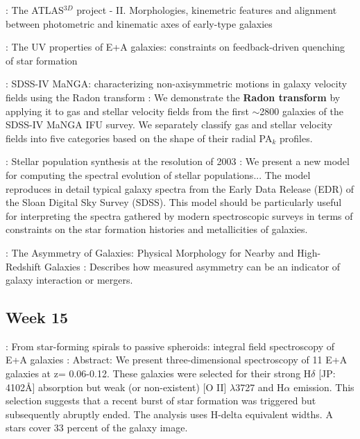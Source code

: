 \documentclass[ceqn,usenatbib,onecolumn]{mnras}
\begin{document}
\par \citet{2011MNRAS.414.2923K} : {The ATLAS$^{3D}$ project - II. Morphologies, kinemetric features and alignment between photometric and kinematic axes of early-type galaxies}
\par \citet{2007MNRAS.382..960K} : {The UV properties of E+A galaxies: constraints on feedback-driven quenching of star formation}
\par \citet{2018MNRAS.480.2217S} : {SDSS-IV MaNGA: characterizing non-axisymmetric motions in galaxy velocity fields using the Radon transform} :  We demonstrate the \textbf{Radon transform} by applying it to gas and stellar velocity fields from the first $\sim$2800 galaxies of the SDSS-IV MaNGA IFU survey. We separately classify gas and stellar velocity fields into five categories based on the shape of their radial PA$_k$ profiles. 
\par \citet{2003MNRAS.344.1000B} : {Stellar population synthesis at the resolution of 2003} : We present a new model for computing the spectral evolution of stellar populations... The model reproduces in detail typical galaxy spectra from the Early Data Release (EDR) of the Sloan Digital Sky Survey (SDSS). This model should be particularly useful for interpreting the spectra gathered by modern spectroscopic surveys in terms of constraints on the star formation histories and metallicities of galaxies.
\par \citet{2000ApJ...529..886C} : {The Asymmetry of Galaxies: Physical Morphology for Nearby and High-Redshift Galaxies} : Describes how measured asymmetry can be an indicator of galaxy interaction or mergers.

\subsection{Week 15}
\par \citet{2012MNRAS.420..672S} : {From star-forming spirals to passive spheroids: integral field spectroscopy of E+A galaxies} : Abstract: We present three-dimensional spectroscopy of 11 E+A galaxies at z= 0.06-0.12. These galaxies were selected for their strong H$\delta$ [JP: 4102\AA] absorption but weak (or non-existent) [O II] $\lambda$3727 and H$\alpha$ emission. This selection suggests that a recent burst of star formation was triggered but subsequently abruptly ended. The analysis uses H-delta equivalent widths. A stars cover 33 percent of the galaxy image. 
\end{document}
